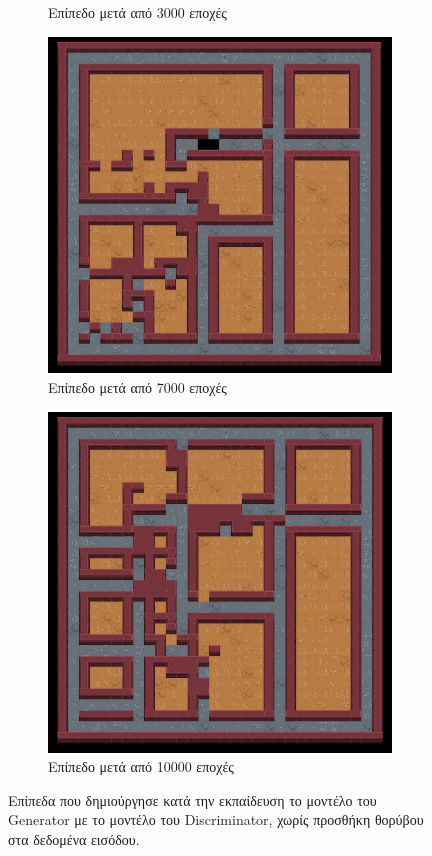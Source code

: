 \begin{figure}[H]
\begin{subfigure}{.5\textwidth}
  \caption{Επίπεδο μετά από 3000 εποχές}
  \label{fig:sfig2}
\end{subfigure}
\begin{subfigure}{.5\textwidth}
  \centering
  \includegraphics[width=.8\linewidth]{../images/result_images/cnn-gan/combined_7000.png}
  \caption{Επίπεδο μετά από 7000 εποχές}
  \label{fig:sfig2}
\end{subfigure}
\begin{subfigure}{.5\textwidth}
  \centering
  \includegraphics[width=.8\linewidth]{../images/result_images/cnn-gan/combined_10000.png}
  \caption{Επίπεδο μετά από 10000 εποχές}
  \label{fig:sfig2}
\end{subfigure}
\caption{Επίπεδα που δημιούργησε κατά την εκπαίδευση το μοντέλο του Generator με το μοντέλο του Discriminator, χωρίς προσθήκη θορύβου στα δεδομένα εισόδου.}
\label{fig:fig}
\end{figure}


